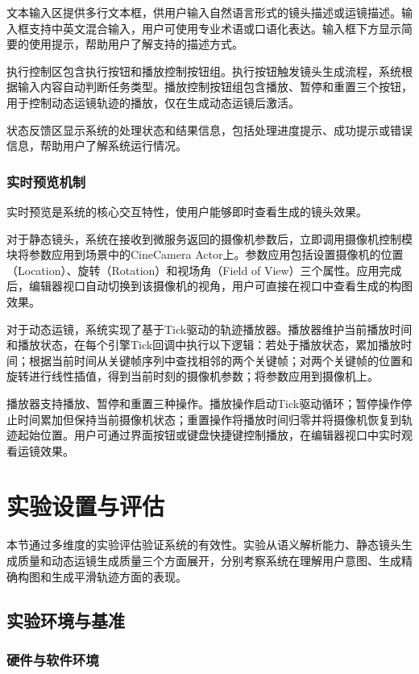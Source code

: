 文本输入区提供多行文本框，供用户输入自然语言形式的镜头描述或运镜描述。输入框支持中英文混合输入，用户可使用专业术语或口语化表达。输入框下方显示简要的使用提示，帮助用户了解支持的描述方式。

执行控制区包含执行按钮和播放控制按钮组。执行按钮触发镜头生成流程，系统根据输入内容自动判断任务类型。播放控制按钮组包含播放、暂停和重置三个按钮，用于控制动态运镜轨迹的播放，仅在生成动态运镜后激活。

状态反馈区显示系统的处理状态和结果信息，包括处理进度提示、成功提示或错误信息，帮助用户了解系统运行情况。

\subsubsection{实时预览机制}

实时预览是系统的核心交互特性，使用户能够即时查看生成的镜头效果。

对于静态镜头，系统在接收到微服务返回的摄像机参数后，立即调用摄像机控制模块将参数应用到场景中的CineCamera Actor上。参数应用包括设置摄像机的位置（Location）、旋转（Rotation）和视场角（Field of View）三个属性。应用完成后，编辑器视口自动切换到该摄像机的视角，用户可直接在视口中查看生成的构图效果。

对于动态运镜，系统实现了基于Tick驱动的轨迹播放器。播放器维护当前播放时间和播放状态，在每个引擎Tick回调中执行以下逻辑：若处于播放状态，累加播放时间；根据当前时间从关键帧序列中查找相邻的两个关键帧；对两个关键帧的位置和旋转进行线性插值，得到当前时刻的摄像机参数；将参数应用到摄像机上。

播放器支持播放、暂停和重置三种操作。播放操作启动Tick驱动循环；暂停操作停止时间累加但保持当前摄像机状态；重置操作将播放时间归零并将摄像机恢复到轨迹起始位置。用户可通过界面按钮或键盘快捷键控制播放，在编辑器视口中实时观看运镜效果。

\section{实验设置与评估}

本节通过多维度的实验评估验证系统的有效性。实验从语义解析能力、静态镜头生成质量和动态运镜生成质量三个方面展开，分别考察系统在理解用户意图、生成精确构图和生成平滑轨迹方面的表现。

\subsection{实验环境与基准}

\subsubsection{硬件与软件环境}

